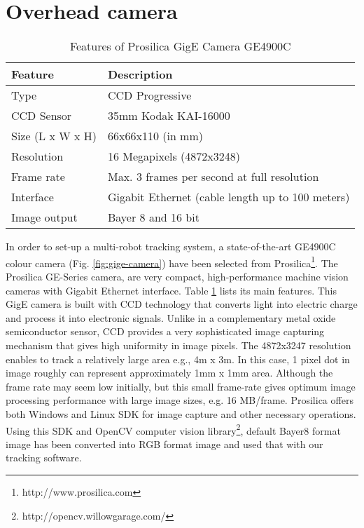 \section{Overhead camera}
\begin{table}
\caption{Features of Prosilica GigE Camera GE4900C}
\label{table:ge4900c}
\begin{center}
\begin{tabular}{|l||l|}
\hline \textbf{Feature} & \textbf{Description}\\
\hline Type & CCD Progressive\\
\hline CCD Sensor & 35mm Kodak KAI-16000\\
\hline Size (L x W x H) & 66x66x110 (in mm)\\
\hline Resolution & 16 Megapixels (4872x3248)\\ 
\hline Frame rate & Max. 3 frames per second at full resolution\\
\hline Interface & Gigabit Ethernet (cable length up to 100 meters)\\
\hline Image output & Bayer 8 and 16 bit\\
\hline
\end{tabular}
\end{center}
\end{table}
In order to set-up a multi-robot tracking system, a state-of-the-art GE4900C colour camera (Fig. \ref{fig:gige-camera})  have been selected from Prosilica\footnote{http://www.prosilica.com}. The Prosilica GE-Series camera, are very compact, high-performance machine vision cameras with Gigabit Ethernet interface.  Table \ref{table:ge4900c} lists its main features. This GigE camera is built with \acf{CCD} technology that converts light into electric charge and process it into electronic signals. Unlike in a complementary metal oxide semiconductor sensor, CCD provides a very sophisticated image capturing mechanism that gives high uniformity in image pixels. The 4872x3247 resolution enables to track a relatively large area e.g., 4m x 3m. In this case, 1 pixel dot in image roughly can represent approximately 1mm x 1mm area. Although the frame rate may seem low initially, but this small frame-rate gives optimum image processing performance with large image sizes, e.g. 16 MB/frame. Prosilica offers both Windows and Linux \acf{SDK} for image capture and other necessary operations. Using this SDK and OpenCV computer vision library\footnote{http://opencv.willowgarage.com/},  default Bayer8 format image has been converted into RGB format image and used that with our tracking software.
